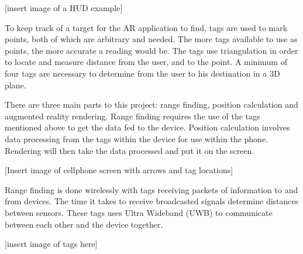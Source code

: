 [insert image of a HUD example]

To keep track of a target for the AR application to find, tags are used to mark points, both of which are arbitrary and needed. The more tags available to use as points, the more accurate a reading would be. The tags use triangulation in order to locate and measure distance from the user, and to the point. A minimum of four tags are necessary to determine from the user to his destination in a 3D plane.

There are three main parts to this project: range finding, position calculation and augmented reality rendering. Range finding requires the use of the tags mentioned above to get the data fed to the device. Position calculation involves data processing from the tags within the device for use within the phone. Rendering will then take the data processed and put it on the screen.

[Insert image of cellphone screen with arrows and tag locations]

Range finding is done wirelessly with tags receiving packets of information to and from devices. The time it takes to receive broadcasted signals determine distances between sensors. These tags uses Ultra Wideband (UWB) to communicate between each other and the device together.

[insert image of tags here]
